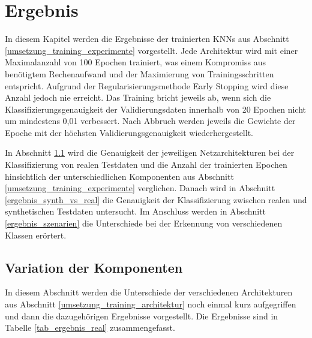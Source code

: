 

\chapter{Ergebnis}
\label{ergebnis}

In diesem Kapitel werden die Ergebnisse der trainierten \acp{KNN} aus Abschnitt \ref{umsetzung_training_experimente} vorgestellt. Jede Architektur wird mit einer Maximalanzahl von 100 Epochen trainiert, was einem Kompromiss aus benötigtem Rechenaufwand und der Maximierung von Trainingsschritten entspricht. Aufgrund der Regularisierungsmethode Early Stopping wird diese Anzahl jedoch nie erreicht. Das Training bricht jeweils ab, wenn sich die Klassifizierungsgenauigkeit der Validierungsdaten innerhalb von 20 Epochen nicht um mindestens 0,01 verbessert. Nach Abbruch werden jeweils die Gewichte der Epoche mit der höchsten Validierungsgenauigkeit wiederhergestellt. 

In Abschnitt \ref{ergebnis_parameter} wird die Genauigkeit der jeweiligen Netzarchitekturen bei der Klassifizierung von realen Testdaten und die Anzahl der trainierten Epochen hinsichtlich der unterschiedlichen Komponenten aus Abschnitt \ref{umsetzung_training_experimente} verglichen. Danach wird in Abschnitt \ref{ergebnis_synth_vs_real} die Genauigkeit der Klassifizierung zwischen realen und synthetischen Testdaten untersucht. Im Anschluss werden in Abschnitt \ref{ergebnis_szenarien} die Unterschiede bei der Erkennung von verschiedenen Klassen erörtert.

\section{Variation der Komponenten}
\label{ergebnis_parameter}

In diesem Abschnitt werden die Unterschiede der verschiedenen Architekturen aus Abschnitt \ref{umsetzung_training_architektur} noch einmal kurz aufgegriffen und dann die dazugehörigen Ergebnisse vorgestellt. Die Ergebnisse sind in Tabelle \ref{tab_ergebnis_real} zusammengefasst.

